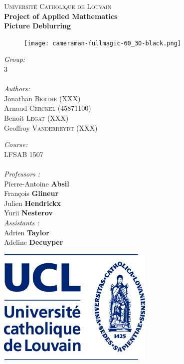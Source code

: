 \begin{titlepage}
\begin{center}
\textsc{\Large Université Catholique de Louvain}\\[0.5cm]
{\Large \bfseries Project of Applied Mathematics}\\
{\huge \bfseries Picture Deblurring
}\\
\end{center}
\vfill
\begin{figure}[h!]
\texttt{[image: cameraman-fullmagic-60\_30-black.png]}
\centering
\end{figure}
\vfill
\begin{minipage}{0.5\textwidth}
\begin{flushleft} \large
\emph{Group:} \\
3\\
~\\
\emph{Authors:}\\
Jonathan \textsc{Berthe} (XXX)\\
Arnaud \textsc{Cerckel} (45871100)\\
Benoit \textsc{Legat} (XXX)\\
Geoffroy \textsc{Vanderreydt} (XXX)\\
\end{flushleft}
\end{minipage}
\begin{minipage}{0.5\textwidth}
\begin{flushright} \large
\emph{Course:} \\
LFSAB 1507\\
~\\
\emph{Professors :} \\
Pierre-Antoine \textbf{Absil}\\
François \textbf{Glineur}\\
Julien \textbf{Hendrickx}\\
Yurii \textbf{Nesterov}\\
\emph{Assistants :}\\
Adrien \textbf{Taylor}\\
Adeline \textbf{Decuyper}
\end{flushright}
\end{minipage}
\vfill
\begin{center}
\begin{minipage}{0.25\textwidth}
\begin{flushleft}
\includegraphics[scale=0.25]{Couverture/ucl-logo.jpg}

\end{flushleft}
\end{minipage}
\end{center}
\end{titlepage}
